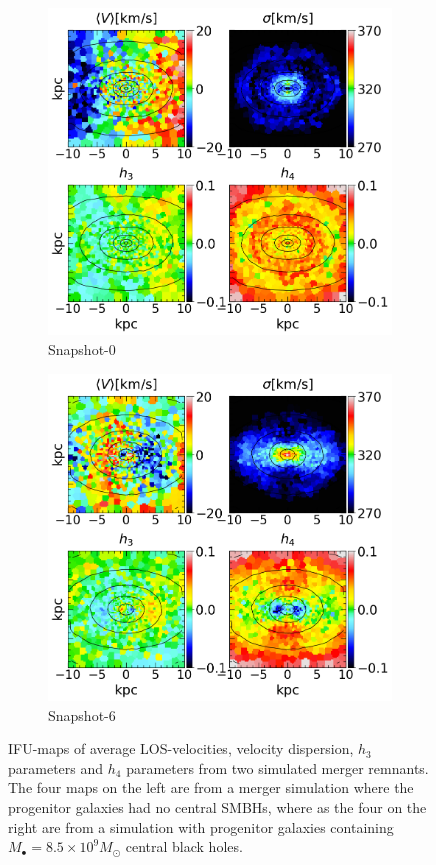 \documentclass[english, oneside]{HYgradu}
\begin{document}
\begin{figure}
	\centering
	\begin{subfigure}[b]{0.49\textwidth}
		\includegraphics[width=\textwidth]{BH_0.png}
		\caption{Snapshot-0}
	\end{subfigure}
	\begin{subfigure}[b]{0.49\textwidth}
		\includegraphics[width=\textwidth]{BH_6.png}
		\caption{Snapshot-6}
	\end{subfigure}
	\caption{IFU-maps of average LOS-velocities, velocity dispersion, $h_3$ parameters and $h_4$ parameters from two simulated merger remnants. The four maps on the left are from a merger simulation where the progenitor galaxies had no central SMBHs, where as the four on the right are from a simulation with progenitor galaxies containing $M_\bullet = 8.5 \times 10^9 M_\odot$ central black holes.}
\end{figure}
\end{document}

